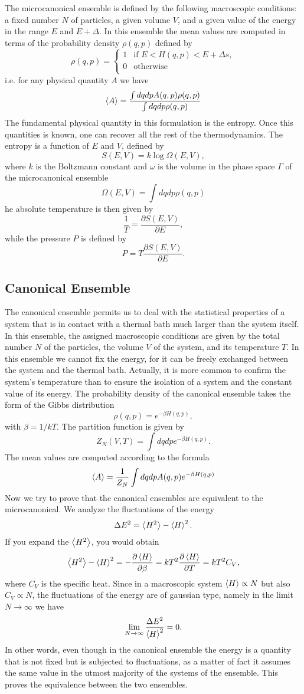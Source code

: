 \documentclass[10pt]{article}
\begin{document}
	The microcanonical ensemble is defined by the following macroscopic conditions: a fixed number $N$ of particles, a given volume $V$, and a given value of the energy in the range $E$ and $E+\Delta$. In this ensemble the mean values are computed in terms of the probability density $\rho(q,p)$ defined by 
	$$
	\rho \left( q,p \right) =\begin{cases}
		1&		\text{if}\,\,E<H\left( q,p \right) <E+\Delta s,\\
		0&		\text{otherwise}\\
	\end{cases}
	$$
	i.e. for any physical quantity $A$ we have
	$$
	\expval{A}=\frac{\int dq dp A(q,p) \rho(q,p)}{\int dq dp \rho(q,p)}
	$$
	The fundamental physical quantity in this formulation is the entropy. Once this quantities is known, one can recover all the rest of the thermodynamics. The entropy is a function of $E$ and $V$, defined by
	$$
	S(E,V)=k\log\Omega(E,V),
	$$
	where $k$ is the Boltzmann constant and $\omega$ is the volume in the phase space $\Gamma$ of the microcanonical ensemble
	$$
	\Omega(E,V)=\int dq dp \rho(q,p)
	$$
	he absolute temperature is then given by
	$$\frac{1}{T}=\frac{\partial S(E,V)}{\partial E},$$
	while the pressure $P$ is defined by $$P=T\frac{\partial S(E,V)}{\partial E}.$$
	\subsection{Canonical Ensemble}\label{Canonical Ensemble}
	The canonical ensemble permits us to deal with the statistical properties of a system that is in contact with a thermal bath much larger than the system itself. In this ensemble, the assigned macroscopic conditions are given by the total number $N$ of the particles, the volume $V$ of the system, and its temperature $T$. In this ensemble we cannot fix the energy, for it can be freely exchanged between the system and the thermal bath. Actually, it is more common to confirm the system's temperature than to ensure the isolation of a system and the constant value of its energy. The probability density of the canonical ensemble takes the form of the Gibbs distribution 
	$$\rho(q,p)=e^{-\beta H(q,p)},$$
	with $\beta=1/kT$. The partition function is given by 
	$$Z_N(V,T)=\int dq dp e^{-\beta H(q,p)}.$$
	The mean values are computed according to the formula 
	$$\expval{A}=\dfrac{1}{Z_N}\int dq dp A(q,p)e^{-\beta H(q,p)}$$
	Now we try to prove that the canonical ensembles are equivalent to the microcanonical. We analyze the fluctuations of the energy
	$$\Delta E^2=\expval{H^2}-\expval{H}^2.$$
	If you expand the $\expval{H^2}$, you would obtain 
	$$\expval{H^2}-\expval{H}^2=-\pdv{\expval{H}}{\beta}=kT^2\pdv{\expval{H}}{T}=kT^2C_V,$$
	where $C_V$ is the specific heat. Since in a macroscopic system $\expval{H}\propto N$ but also $C_V\propto N$, the fluctuations of the energy are of gaussian type, namely in the limit $N\rightarrow\infty$ we have 
	$$\lim_{N\rightarrow\infty}\frac{\Delta E^2}{\expval{H}^2}=0.$$
	In other words, even though in the canonical ensemble the energy is a quantity that is not fixed but is subjected to fluctuations, as a matter of fact it assumes the same value in the utmost majority of the systems of the ensemble. This proves the equivalence between the two ensembles.
\end{document}
